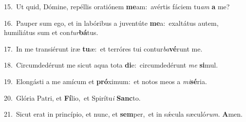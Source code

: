 {\numbfont\textcolor{\numbcolor}{15.}}~Ut quid, Dómine, repéllis oratiónem \textbf{me}\-am:~\star avértis fáciem tu\textit{am} \textbf{a} me?\par
{\numbfont\textcolor{\numbcolor}{16.}}~Pauper sum ego, et in labóribus a juventúte \textbf{me}\-a:~\star exaltátus autem, humiliátus sum et con\-\textit{tur}\-\textbf{bá}tus.\par
{\numbfont\textcolor{\numbcolor}{17.}}~In me transiérunt iræ \textbf{tu}\-æ:~\star et terróres tui contur\-\textit{ba}\-\textbf{vé}runt me.\par
{\numbfont\textcolor{\numbcolor}{18.}}~Circumdedérunt me sicut aqua tota \textbf{di}\-e:~\star circumdedérunt \textit{me} \textbf{si}\-mul.\par
{\numbfont\textcolor{\numbcolor}{19.}}~Elongásti a me amícum et \textbf{pró}\-ximum:~\star et notos meos a \textit{mi}\-\textbf{sé}ria.\par
{\numbfont\textcolor{\numbcolor}{20.}}~Glória Patri, et \textbf{Fí}\-lio,~\star et Spirítu\textit{i} \textbf{Sanc}\-to.\par
{\numbfont\textcolor{\numbcolor}{21.}}~Sicut erat in princípio, et nunc, et \textbf{sem}\-per,~\star et in sǽcula sæculó\-\textit{rum}\-. \textbf{A}\-men.\par

